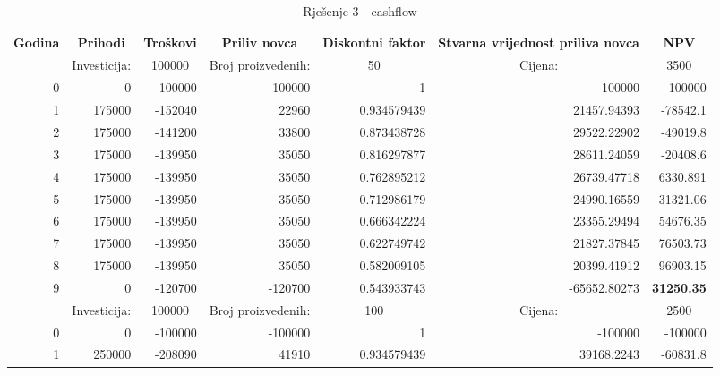 \documentclass[12pt]{article}
\begin{document}
\begin{landscape}
\begin{table}[htbp]
  \centering
  \caption{Rješenje 3 - cashflow}
    \begin{tabular}{rrrrrrr}
    \toprule
    \multicolumn{1}{c}{Godina} & \multicolumn{1}{c}{Prihodi} & \multicolumn{1}{c}{Troškovi} & \multicolumn{1}{c}{Priliv novca} & \multicolumn{1}{c}{Diskontni faktor} & \multicolumn{1}{p{8.145em}}{Stvarna vrijednost \newline{}priliva novca} & \multicolumn{1}{c}{NPV} \\
    \midrule
          & \multicolumn{1}{c}{Investicija:} & \multicolumn{1}{c}{100000} & \multicolumn{1}{c}{Broj proizvedenih:} & \multicolumn{1}{c}{50} & \multicolumn{1}{c}{Cijena:} & \multicolumn{1}{c}{3500} \\
    \midrule
    0     & 0     & -100000 & -100000 & 1     & -100000 & -100000 \\
    1     & 175000 & -152040 & 22960 & 0.934579439 & 21457.94393 & -78542.1 \\
    2     & 175000 & -141200 & 33800 & 0.873438728 & 29522.22902 & -49019.8 \\
    3     & 175000 & -139950 & 35050 & 0.816297877 & 28611.24059 & -20408.6 \\
    4     & 175000 & -139950 & 35050 & 0.762895212 & 26739.47718 & 6330.891 \\
    5     & 175000 & -139950 & 35050 & 0.712986179 & 24990.16559 & 31321.06 \\
    6     & 175000 & -139950 & 35050 & 0.666342224 & 23355.29494 & 54676.35 \\
    7     & 175000 & -139950 & 35050 & 0.622749742 & 21827.37845 & 76503.73 \\
    8     & 175000 & -139950 & 35050 & 0.582009105 & 20399.41912 & 96903.15 \\
    9     & 0     & -120700 & -120700 & 0.543933743 & -65652.80273 & \textbf{31250.35} \\
    \midrule
          & \multicolumn{1}{c}{Investicija:} & \multicolumn{1}{c}{100000} & \multicolumn{1}{c}{Broj proizvedenih:} & \multicolumn{1}{c}{100} & \multicolumn{1}{c}{Cijena:} & \multicolumn{1}{c}{2500} \\
    \midrule
    0     & 0     & -100000 & -100000 & 1     & -100000 & -100000 \\
    1     & 250000 & -208090 & 41910 & 0.934579439 & 39168.2243 & -60831.8 \\

\end{tabular}
\end{table}
\end{landscape}
\end{document}
